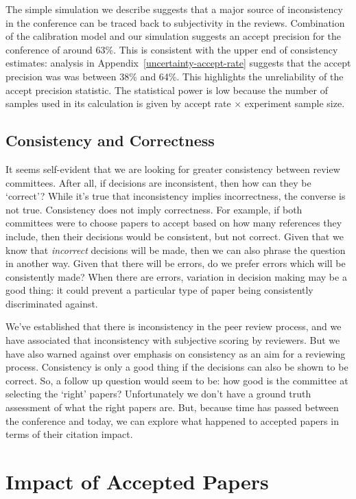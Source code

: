 \documentclass[twoside]{article}
\begin{document}
The simple simulation we describe suggests that a major source of
inconsistency in the conference can be traced back to subjectivity in
the reviews. Combination of the calibration model and our simulation
suggests an accept precision for the conference of around 63\%. This
is consistent with the upper end of consistency estimates: analysis in Appendix~\ref{uncertainty-accept-rate}
suggests that the accept precision was was between 38\% and 64\%. This highlights the
unreliability of the accept precision statistic. The statistical power
is low because the number of samples used in its calculation is given
by accept rate $\times$ experiment sample size.

\subsection{Consistency and Correctness}

It seems self-evident that we are looking for greater consistency between review
committees. After all, if decisions are inconsistent, then how can
they be `correct'? While it's true that inconsistency implies
incorrectness, the converse is not true. Consistency does not imply
correctness. For example, if both committees were to choose papers to
accept based on how many references they include, then their decisions
would be consistent, but not correct. Given that we know that
\emph{incorrect} decisions will be made, then we can also phrase the
question in another way. Given that there will be errors, do we prefer
errors which will be consistently made? When there are errors,
variation in decision making may be a good thing: it could prevent a
particular type of paper being consistently discriminated against.

We've established that there is inconsistency in the peer review
process, and we have associated that inconsistency with subjective
scoring by reviewers. But we have also warned against over emphasis on
consistency as an aim for a reviewing process. Consistency is only a
good thing if the decisions can also be shown to be correct. So, a
follow up question would seem to be: how good is the committee at
selecting the `right' papers? Unfortunately we don't have a ground
truth assessment of what the right papers are. But, because time has
passed between the conference and today, we can explore what happened
to accepted papers in terms of their citation impact.

\section{Impact of Accepted Papers}
\end{document}
